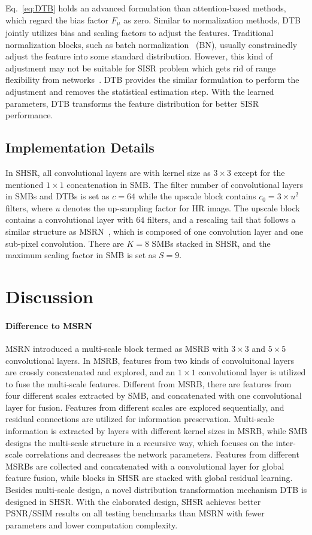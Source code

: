 \documentclass[manuscript,screen]{acmart}
\begin{document}
Eq.~\ref{eq:DTB} holds an advanced formulation than attention-based methods, which regard the bias factor $F_\mu$ as zero. Similar to normalization methods, DTB jointly utilizes bias and scaling factors to adjust the features. Traditional normalization blocks, such as batch normalization~\cite{batchnorm_icml2015} (BN), usually constrainedly adjust the feature into some standard distribution. However, this kind of adjustment may not be suitable for SISR problem which gets rid of range flexibility from networks~\cite{edsr_cvpr2017}. DTB provides the similar formulation to perform the adjustment and removes the statistical estimation step. With the learned parameters, DTB transforms the feature distribution for better SISR performance.

\subsection{Implementation Details}
In SHSR, all convolutional layers are with kernel size as $3\times3$ except for the mentioned $1\times1$ concatenation in SMB. The filter number of convolutional layers in SMBs and DTBs is set as $c=64$ while the upscale block contains $c_0=3 \times u^2$ filters, where $u$ denotes the up-sampling factor for HR image. The upscale block contains a convolutional layer with $64$ filters, and a rescaling tail that follows a similar structure as MSRN~\cite{msrn_eccv2018}, which is composed of one convolution layer and one sub-pixel convolution. There are $K=8$ SMBs stacked in SHSR, and the maximum scaling factor in SMB is set as $S=9$.

\section{Discussion}
\paragraph{Difference to MSRN~\cite{msrn_eccv2018}}
MSRN introduced a multi-scale block termed as MSRB with $3\times3$ and $5\times5$ convolutional layers. In MSRB, features from two kinds of convoluitonal layers are crossly concatenated and explored, and an $1\times1$ convolutional layer is utilized to fuse the multi-scale features.
Different from MSRB, there are features from four different scales extracted by SMB, and concatenated with one convolutional layer for fusion. Features from different scales are explored sequentially, and residual connections are utilized for information preservation.
Multi-scale information is extracted by layers with different kernel sizes in MSRB, while SMB designs the multi-scale structure in a recursive way, which focuses on the inter-scale correlations and decreases the network parameters.
Features from different MSRBs are collected and concatenated with a convolutional layer for global feature fusion, while blocks in SHSR are stacked with global residual learning.
Besides multi-scale design, a novel distribution transformation mechanism DTB is designed in SHSR. With the elaborated design, SHSR achieves better PSNR/SSIM results on all testing benchmarks than MSRN with fewer parameters and lower computation complexity.
\end{document}
